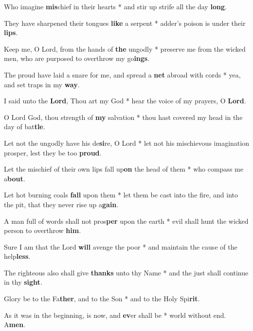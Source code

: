 \begin{multicols}{2}
	Who imagine \textbf{mis}chief in their hearts * and stir up strife all the day \textbf{long}.
	
	They have sharpened their tongues \textbf{like} a serpent * adder's poison is under their \textbf{lips}.
	
	Keep me, O Lord, from the hands of \textbf{the} ungodly * preserve me from the wicked men, who are purposed to overthrow my go\textbf{ings}.
	
	The proud have laid a snare for me, and spread a \textbf{net} abroad with cords * yea, and set traps in my \textbf{way}.
	
	I said unto the \textbf{Lord}, Thou art my God * hear the voice of my prayers, O \textbf{Lord}.
	
	O Lord God, thou strength of \textbf{my} salvation * thou hast covered my head in the day of bat\textbf{tle}.
	
	Let not the ungodly have his de\textbf{si}re, O Lord * let not his mischievous imagination prosper, lest they be too \textbf{proud}.
	
	Let the mischief of their own lips fall up\textbf{on} the head of them * who compass me a\textbf{bout}.
	
	Let hot burning coals \textbf{fall} upon them * let them be cast into the fire, and into the pit, that they never rise up a\textbf{gain}.
	
	A man full of words shall not pros\textbf{per} upon the earth * evil shall hunt the wicked person to overthrow \textbf{him}.
	
	Sure I am that the Lord \textbf{will} avenge the poor * and maintain the cause of the help\textbf{less}.
	
	The righteous also shall give \textbf{thanks} unto thy Name * and the just shall continue in thy \textbf{sight}.
	
	Glory be to the Fa\textbf{ther}, and to the Son * and to the Holy Spi\textbf{rit}.
	
	As it was in the beginning, is now, and \textbf{ev}er shall be * world without end. A\textbf{men}.
\end{multicols}